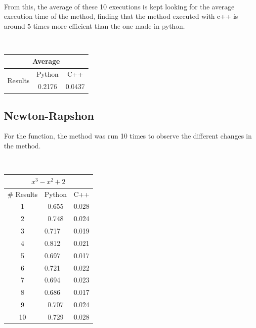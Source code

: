\documentclass[conference]{IEEEtran}
\begin{document}
\


From this, the average of these 10 executions is kept looking for the average execution time of the method, finding that the method executed with c++ is around 5 times more efficient than the one made in python.

\

\begin{tabular}{|c|c|c|}
\hline
\multicolumn{3}{|c|}{Average}              \\ \hline
\multirow{2}{*}{Results} & Python & C++    \\ \cline{2-3} 
                         & 0.2176 & 0.0437 \\ \hline
\end{tabular}




\subsection{Newton-Rapshon}


For the function, the method was run 10 times to observe the different changes in the method.

\

\begin{tabular}{|c|l|l}
\hline
\multicolumn{3}{|c|}{\(x^3 - x^2+ 2\)}   \\ \hline
\# Results & \multicolumn{1}{c|}{Python} & \multicolumn{1}{c|}{C++}   \\ \hline
1          & \multicolumn{1}{c|}{0.655}  & \multicolumn{1}{c|}{0.028} \\ \hline
2          & \multicolumn{1}{c|}{0.748}  & \multicolumn{1}{c|}{0.024} \\ \hline
3          & 0.717                       & \multicolumn{1}{l|}{0.019} \\ \hline
4          & 0.812                       & \multicolumn{1}{l|}{0.021} \\ \hline
5          & 0.697                       & \multicolumn{1}{l|}{0.017} \\ \hline
6          & 0.721                       & \multicolumn{1}{l|}{0.022} \\ \hline
7          & 0.694                       & \multicolumn{1}{l|}{0.023} \\ \hline
8          & 0.686                       & \multicolumn{1}{l|}{0.017} \\ \hline
9          & \multicolumn{1}{c|}{0.707}  & \multicolumn{1}{c|}{0.024} \\ \hline
10         & \multicolumn{1}{c|}{0.729}  & \multicolumn{1}{c|}{0.028} \\ \hline
\end{tabular}
\end{document}

